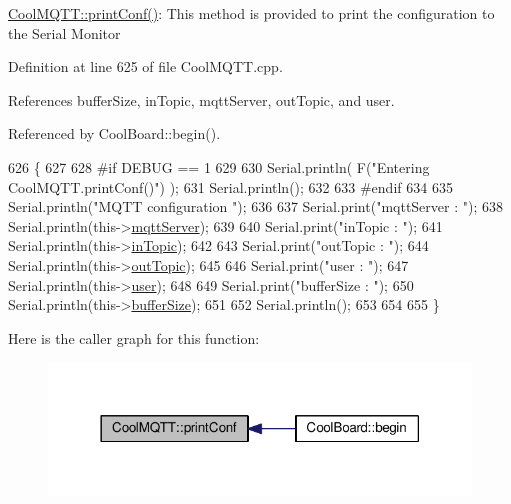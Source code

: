 \hyperlink{classCoolMQTT_a40553a0ad4b5ecf1cb4411ab54ca85fb}{Cool\+M\+Q\+T\+T\+::print\+Conf()}\+: This method is provided to print the configuration to the Serial Monitor 

Definition at line 625 of file Cool\+M\+Q\+T\+T.\+cpp.



References buffer\+Size, in\+Topic, mqtt\+Server, out\+Topic, and user.



Referenced by Cool\+Board\+::begin().


\begin{DoxyCode}
626 \{
627 
628 \textcolor{preprocessor}{#if DEBUG == 1 }
629 
630     Serial.println( F(\textcolor{stringliteral}{"Entering CoolMQTT.printConf()"}) );
631     Serial.println();   
632 
633 \textcolor{preprocessor}{#endif}
634     
635     Serial.println(\textcolor{stringliteral}{"MQTT configuration "});
636 
637     Serial.print(\textcolor{stringliteral}{"mqttServer : "});
638     Serial.println(this->\hyperlink{classCoolMQTT_ab8bb951f87ddbf92db74c2ad16a3e53e}{mqttServer});
639 
640     Serial.print(\textcolor{stringliteral}{"inTopic : "});
641     Serial.println(this->\hyperlink{classCoolMQTT_a4492f52a441e83cc5151010317fdb52d}{inTopic});
642 
643     Serial.print(\textcolor{stringliteral}{"outTopic : "});
644     Serial.println(this->\hyperlink{classCoolMQTT_a109c786a17b463f9eeba046194279522}{outTopic});
645 
646     Serial.print(\textcolor{stringliteral}{"user : "});
647     Serial.println(this->\hyperlink{classCoolMQTT_a8cd47e45d457f908d4b4390b35aaee83}{user});
648 
649     Serial.print(\textcolor{stringliteral}{"bufferSize : "});
650     Serial.println(this->\hyperlink{classCoolMQTT_a7f3cf26b51d6770f216e42c5ef13ca9f}{bufferSize});
651 
652     Serial.println();
653 
654 
655 \}
\end{DoxyCode}
Here is the caller graph for this function\+:\nopagebreak
\begin{figure}[H]
\begin{center}
\leavevmode
\includegraphics[width=318pt]{classCoolMQTT_a40553a0ad4b5ecf1cb4411ab54ca85fb_icgraph}
\end{center}
\end{figure}
\mbox{\label{classCoolMQTT_ace977b3e90ab14b1199fe5c4fb0a13ec}} 
